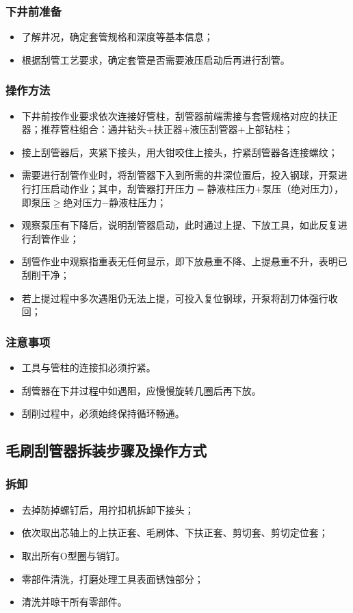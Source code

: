 \subsubsection{下井前准备}
		\begin{itemize}
		\item 了解井况，确定套管规格和深度等基本信息；
		\item 根据刮管工艺要求，确定套管是否需要液压启动后再进行刮管。
		\end{itemize}
	
\subsubsection{操作方法}
\begin{itemize}
	\item 下井前按作业要求依次连接好管柱，刮管器前端需接与套管规格对应的扶正器；推荐管柱组合：通井钻头+扶正器+液压刮管器+上部钻柱；
	\item 接上刮管器后，夹紧下接头，用大钳咬住上接头，拧紧刮管器各连接螺纹；
	\item 需要进行刮管作业时，将刮管器下入到所需的井深位置后，投入钢球，开泵进行打压启动作业；其中，刮管器打开压力$=$静液柱压力$+$泵压（绝对压力），即泵压$\ge$绝对压力$-$静液柱压力；
	\item 观察泵压有下降后，说明刮管器启动，此时通过上提、下放工具，如此反复进行刮管作业；
	\item 刮管作业中观察指重表无任何显示，即下放悬重不降、上提悬重不升，表明已刮削干净；
	\item 若上提过程中多次遇阻仍无法上提，可投入复位钢球，开泵将刮刀体强行收回；
	\end{itemize}
\subsubsection{注意事项}
	\begin{itemize}
		\item 工具与管柱的连接扣必须拧紧。
		\item 刮管器在下井过程中如遇阻，应慢慢旋转几圈后再下放。
		\item 刮削过程中，必须始终保持循环畅通。
	\end{itemize}
\subsection{毛刷刮管器拆装步骤及操作方式}
\subsubsection{拆卸}\label{sec:unstep_swiper}
	\begin{itemize}
	\item 去掉防掉螺钉后，用拧扣机拆卸下接头；
	\item 依次取出芯轴上的上扶正套、毛刷体、下扶正套、剪切套、剪切定位套；
	\item 取出所有O型圈与销钉。
	\item 零部件清洗，打磨处理工具表面锈蚀部分；
	\item 清洗并晾干所有零部件。
	\end{itemize}

